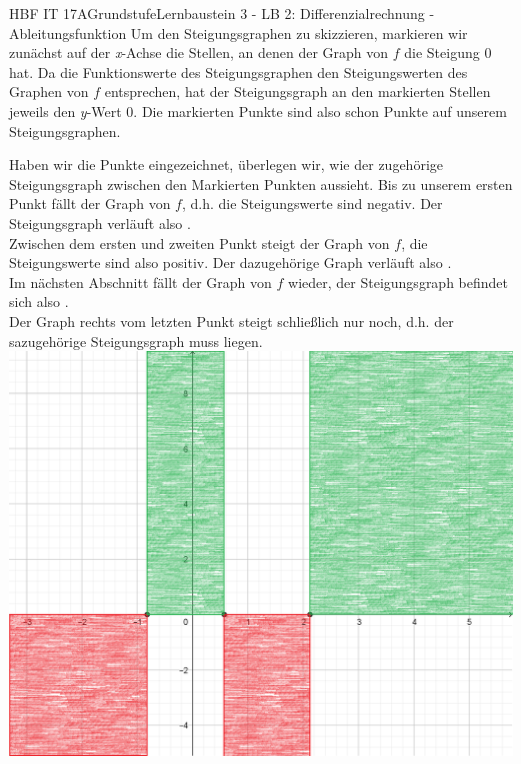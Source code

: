 \documentclass[11pt,twocolumn,oneside,openany,headings=optiontotoc,11pt,numbers=noenddot]{article}
\begin{document}
\begin{worksheet}{HBF IT 17A}{Grundstufe}{Lernbaustein 3 - LB 2: Differenzialrechnung - Ableitungsfunktion}
		Um den Steigungsgraphen zu skizzieren, markieren wir zunächst auf der \textit{x}-Achse die Stellen, an denen der Graph von \(f\) die Steigung 0 hat. Da die Funktionswerte des Steigungsgraphen den Steigungswerten des Graphen von \(f\) entsprechen, hat der Steigungsgraph an den markierten Stellen jeweils den \textit{y}-Wert 0. Die markierten Punkte sind also schon Punkte auf unserem Steigungsgraphen.\\
		\par\bigskip\noindent
		Haben wir die Punkte eingezeichnet, überlegen wir, wie der zugehörige Steigungsgraph zwischen den Markierten Punkten aussieht. Bis zu unserem ersten Punkt fällt der Graph von \(f\), d.h. die Steigungswerte sind negativ. Der Steigungsgraph verläuft also \color{red}{unterhalb der \(x\)-Achse}\normalcolor.\\
		Zwischen dem ersten und zweiten Punkt steigt der Graph von \(f\), die Steigungswerte sind also positiv. Der dazugehörige Graph verläuft also \color{codegreen}{oberhalb der \(x\)-Achse}\normalcolor.\\
		Im nächsten Abschnitt fällt der Graph von \(f\) wieder, der Steigungsgraph befindet sich also \color{red}{unterhalb der \(x\)-Achse}\normalcolor.\\
		Der Graph rechts vom letzten Punkt steigt schließlich nur noch, d.h. der sazugehörige Steigungsgraph muss \color{codegreen}{oberhalb der \(x\)-Achse }\normalcolor liegen.\\
		\includegraphics[scale=0.25]{Bilder/fGef.png}\\
		\par\noindent

\end{worksheet}
\end{document}
